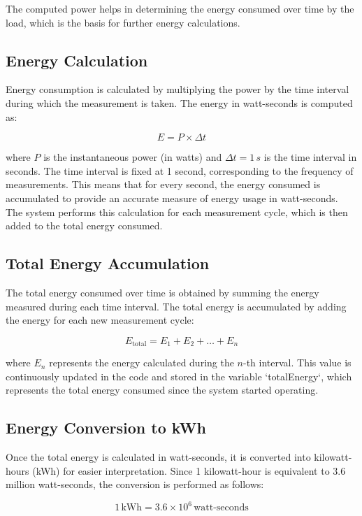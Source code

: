 The computed power helps in determining the energy consumed over time by the load, which is the basis for further energy calculations.

\subsection{Energy Calculation}

Energy consumption is calculated by multiplying the power by the time interval during which the measurement is taken. The energy in watt-seconds is computed as:

\[
E = P \times \Delta t
\]

where \(P\) is the instantaneous power (in watts) and \(\Delta t = 1 \, s\) is the time interval in seconds. The time interval is fixed at 1 second, corresponding to the frequency of measurements. This means that for every second, the energy consumed is accumulated to provide an accurate measure of energy usage in watt-seconds. The system performs this calculation for each measurement cycle, which is then added to the total energy consumed.

\subsection{Total Energy Accumulation}

The total energy consumed over time is obtained by summing the energy measured during each time interval. The total energy is accumulated by adding the energy for each new measurement cycle:

\[
E_{\text{total}} = E_1 + E_2 + \dots + E_n
\]

where \(E_n\) represents the energy calculated during the \(n\)-th interval. This value is continuously updated in the code and stored in the variable `totalEnergy`, which represents the total energy consumed since the system started operating.

\subsection{Energy Conversion to kWh}

Once the total energy is calculated in watt-seconds, it is converted into kilowatt-hours (kWh) for easier interpretation. Since 1 kilowatt-hour is equivalent to 3.6 million watt-seconds, the conversion is performed as follows:

\[
1 \, \text{kWh} = 3.6 \times 10^6 \, \text{watt-seconds}
\]

